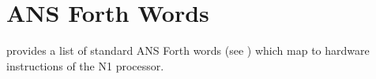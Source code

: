 
\section{ANS Forth Words}
\label{N1_words}

 provides a list of standard ANS Forth words (see \cite{dpans94})
which map to hardware instructions of the N1 processor. 


